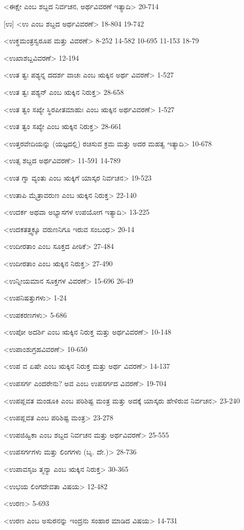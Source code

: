 <ಈಕ್ಷೇ ಎಂಬ ಶಬ್ದದ ನಿರ್ವಚನ, ಅರ್ಥವಿವರಣೆ ಇತ್ಯಾದಿ>
20-714

[ಉ]
<ಉ ಎಂಬ ಶಬ್ದದ ಅರ್ಥವಿವರಣೆ>
18-804 
19-742

<ಉಕ್ಥಮಂತ್ರಸ್ವರೂಪ ಮತ್ತು ವಿವರಣೆ>
8-252 
14-582
10-695 
11-153 
18-79

<ಉಖಾಶಬ್ದವಿವರಣೆ>
12-194

<ಉತ ತ್ವಃ ಪಶ್ಯನ್ನ ದದರ್ಶ ವಾಚಃ ಎಂಬ ಋಕ್ಕಿನ ಅರ್ಥ ವಿವರಣೆ>
1-527

<ಉತ ತ್ವಃ ಪಶ್ಯನ್‍ ಎಂಬ ಋಕ್ಕಿನ ನಿರುಕ್ತ>
28-658

<ಉತ ತ್ವಂ ಸಖ್ಯೇ ಸ್ಥಿರಪೀತಮಾಹುಃ ಎಂಬ ಋಕ್ಕಿನ ಅರ್ಥವಿವರಣೆ>
1-527

<ಉತ ತ್ವಂ ಸಖ್ಯೇ ಎಂಬ ಋಕ್ಕಿನ ನಿರುಕ್ತ>
28-661

<ಉತ್ತರವೇದಿಯನ್ನು (ಯಜ್ಞದಲ್ಲಿ) ರಚಿಸುವ ಕ್ರಮ ಮತ್ತು ಅದರ ಮಹತ್ವ ಇತ್ಯಾದಿ>
10-678

<ಉತ್ಸ ಶಬ್ದದ ಅರ್ಥವಿವರಣೆ>
11-591 
14-789

<ಉತ ಗ್ನಾ ವ್ಯಂತು ಎಂಬ ಋಕ್ಕಿಗೆ ಯಾಸ್ಕರ ನಿರ್ವಚನ>
19-523

<ಉತಾಪಿ ಮೈತ್ರಾವರುಣ ಎಂಬ ಋಕ್ಕಿನ ನಿರುಕ್ತ>
22-140

<ಉದರ್ಕ ಅಥವಾ ಅಭ್ಯಾಸಗಳ ಉಪಯೋಗ ಇತ್ಯಾದಿ>
13-225

<ಉದಕತತ್ತ್ವಕ್ಕೂ ವರುಣನಿಗೂ ಇರುವ ಸಂಬಂಧ>
20-14

<ಉದೀರತಾಂ ಎಂಬ ಸೂಕ್ತದ ಪೀಠಿಕೆ>
27-484

<ಉದೀರತಾಂ ಎಂಬ ಋಕ್ಕಿನ ನಿರುಕ್ತ>
27-490

<ಉನ್ನೀಯಮಾನ ಸೂಕ್ತಗಳ ವಿವರಣೆ>
15-696 
26-49

<ಉಪನಿಷತ್ತುಗಳು>
1-24

<ಉಪಕರಣಗಳು>
5-686

<ಉಪೋ ಅದರ್ಶಿ ಎಂಬ ಋಕ್ಕಿನ ನಿರುಕ್ತ ಮತ್ತು ಅರ್ಥವಿವರಣೆ>
10-148

<ಉಪಾಂಶುಗ್ರಹವಿವರಣೆ>
10-650

<ಉಪ ವ ಏಷೇ ಎಂಬ ಋಕ್ಕಿನ ನಿರುಕ್ತ ಮತ್ತು ಅರ್ಥ ವಿವರಣೆ>
14-137

<ಉಪಸರ್ಗ ಎಂದರೇನು? ಅವ ಎಂಬ ಉಪಸರ್ಗದ ವಿವರಣೆ>
19-704

<ಉಪಪ್ಲವತ ಮಂಡೂಕಿ ಎಂಬ ಪರಿಶಿಷ್ಟ ಮಂತ್ರ ಮತ್ತು ಅದಕ್ಕೆ ಯಾಸ್ಕರು ಹೇಳಿರುವ ನಿರ್ವಚನ>
23-240

<ಉಪಪ್ಲವತ ಎಂಬ ಪರಿಶಿಷ್ಟ ಮಂತ್ರ>
23-278

<ಉಪಜಿಹ್ವಿಕಾ ಎಂಬ ಶಬ್ದದ ನಿರ್ವಚನ ಮತ್ತು ಅರ್ಥವಿವರಣೆ>
25-555

<ಉಪಸರ್ಗಗಳು ಮತ್ತು ಲಿಂಗಗಳು (ಬೃ. ದೇ.)>
28-736

<ಉಪಾವಸೃಜ ತ್ಮನ್ಯಾ ಎಂಬ ಋಕ್ಕಿನ ನಿರುಕ್ತ>
30-365

<ಉಭಯ ಲಿಂಗದೇವತಾ ವಿಷಯ>
12-482

<ಉರಣ>
5-693

<ಉರಣ ಎಂಬ ಅಸುರನನ್ನು ಇಂದ್ರನು ಸಂಹಾರ ಮಾಡಿದ ವಿಷಯ>
14-731

